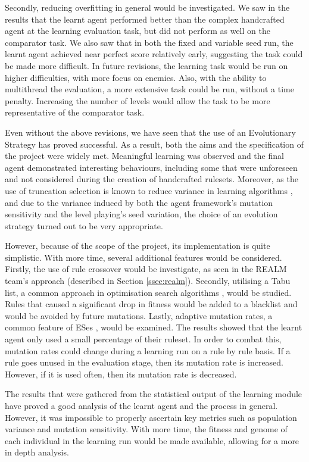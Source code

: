 Secondly, reducing overfitting in general would be investigated. We saw in the results that the learnt agent performed better than the complex handcrafted agent at the learning evaluation task, but did not perform as well on the comparator task. We also saw that in both the fixed and variable seed run, the learnt agent achieved near perfect score relatively early, suggesting the task could be made more difficult. In future revisions, the learning task would be run on higher difficulties, with more focus on enemies. Also, with the ability to multithread the evaluation, a more extensive task could be run, without a time penalty. Increasing the number of levels would allow the task to be more representative of the comparator task.

Even without the above revisions, we have seen that the use of an Evolutionary Strategy has proved successful. As a result, both the aims and the specification of the project were widely met. Meaningful learning was observed and the final agent demonstrated interesting behaviours, including some that were unforeseen and not considered during the creation of handcrafted rulesets. Moreover, as the use of truncation selection is known to reduce variance in learning algorithms \cite[s.~3.8.3]{geatbx}, and due to the variance induced by both the agent framework's mutation sensitivity and the level playing's seed variation, the choice of an evolution strategy turned out to be very appropriate.

However, because of the scope of the project, its implementation is quite simplistic. With more time, several additional features would be considered. Firstly, the use of rule crossover would be investigate, as seen in the REALM team's approach (described in Section \ref{ssec:realm}). Secondly, utilising a Tabu list, a common approach in optimisation search algorithms \cite{tabu}, would be studied. Rules that caused a significant drop in fitness would be added to a blacklist and would be avoided by future mutations. Lastly, adaptive mutation rates, a common feature of ESes \cite[s.~4]{es-book}, would be examined. The results showed that the learnt agent only used a small percentage of their ruleset. In order to combat this, mutation rates could change during a learning run on a rule by rule basis. If a rule goes unused in the evaluation stage, then its mutation rate is increased. However, if it is used often, then its mutation rate is decreased.

The results that were gathered from the statistical output of the learning module have proved a good analysis of the learnt agent and the process in general. However, it was impossible to properly ascertain key metrics such as population variance and mutation sensitivity. With more time, the fitness and genome of each individual in the learning run would be made available, allowing for a more in depth analysis.



